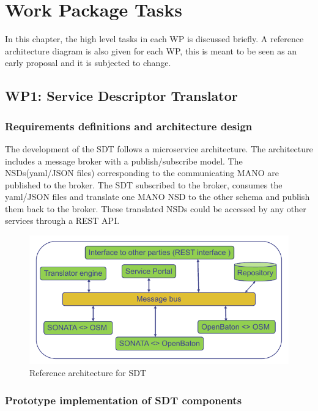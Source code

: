 \chapter{Work Package Tasks}
\label{ch:wptasks}

In this chapter, the high level tasks in each WP is discussed briefly. A reference architecture diagram is also given for each WP, this is meant to be seen as an early proposal and it is subjected to change.

\section{WP1: Service Descriptor Translator}

\subsection{Requirements definitions and architecture design}

The development of the SDT follows a microservice architecture. The architecture includes a message broker with a publish/subscribe model. The NSDs(yaml/JSON files) corresponding to the communicating MANO are published to the broker. The SDT subscribed to the broker, consumes the yaml/JSON files and translate one MANO NSD to the other schema and publish them back to the broker. These translated NSDs could be accessed by any other services through a REST API.
\begin{figure}[h]
	\centering
	\includegraphics[width=0.9\linewidth]{figures/wp1Arch}
	\caption{Reference architecture for SDT \cite{WPDescriptionsPDF}}
	\label{fig:wp1arch}
\end{figure}

\subsection{Prototype implementation of SDT components}

